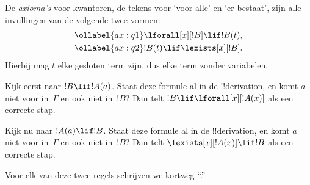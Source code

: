 \documentclass[../../../include/open-logic-section]{subfiles}
\begin{document}


\begin{defn}
De \emph{axioma's} voor kwantoren, de tekens voor `voor alle' en `er
bestaat', zijn alle invullingen van de volgende twee vormen:
\begin{align}
\ollabel{ax:q1} & \lforall[x][!B] \lif !B(t), \\
\ollabel{ax:q2} & !B(t) \lif \lexists[x][!B].
\end{align}
Hierbij mag $t$ elke gesloten term zijn, dus elke term zonder
variabelen.
\end{defn}

\begin{defn}
\item Kijk eerst naar $!B \lif !A(a)$. Staat deze formule al in de
  !!{derivation}, en komt $a$ niet voor in~$\Gamma$ en ook niet in~$!B$? Dan
  telt $!B \lif \lforall[x][!A(x)]$ als een correcte stap.
\item Kijk nu naar $!A(a) \lif !B$. Staat deze formule al in de
  !!{derivation}, en komt $a$ niet voor in~$\Gamma$ en ook niet in~$!B$? Dan
  telt $\lexists[x][!A(x)] \lif !B$ als een correcte stap.
\end{defn}

Voor elk van deze twee regels schrijven we kortweg ``\QR.''
\end{document}
